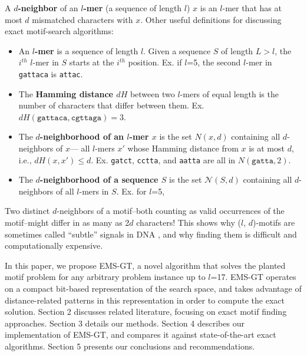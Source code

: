 \documentclass[conference]{IEEEtran}
\begin{document}
	\noindent A {\boldmath \textbf{$d$-neighbor} of an \textbf{$l$-mer}} (a sequence of length $l$) $x$ is an $l$-mer that has at most $d$ mismatched characters with $x$. Other useful definitions for discussing exact motif-search algorithms:
	\begin{itemize}
		\item An \textbf{\boldmath $l$-mer} is a sequence of length $l$.
		Given a sequence $S$ of length $L > l$, the $i^{th}$ $l$-mer in $S$ starts at the $i^{th}$ position.
		Ex. if $l$=5, the second $l$-mer in \texttt{gattaca} is \texttt{attac}.

		\item The \textbf{\boldmath Hamming distance $dH$} 
		between two $l$-mers of equal length is the number of characters that differ between them.
		Ex. $dH(\texttt{gattaca}, \texttt{cgttaga}) = 3$.

		\item The \textbf{\boldmath $d$-neighborhood of an $l$-mer $x$}
		is the set {\boldmath $N(x, d)$} containing all $d$-neighbors of $x$---
		all $l$-mers $x'$ whose Hamming distance from $x$ is at most $d$, i.e., {\boldmath $dH (x, x') \leq d$}.
		\newline Ex. \texttt{gatct}, \texttt{cctta}, and \texttt{aatta} are all in $N(\texttt{gatta}, 2)$.

		\item The \textbf{\boldmath $d$-neighborhood of a sequence $S$} %
		is the set {\boldmath $\mathcal{N}(S, d)$}
		\newline containing all $d$-neighbors of all $l$-mers in $S$. Ex. for $l$=5,
		
		\end{itemize}

	Two distinct $d$-neighbors of a motif--both counting as valid occurrences of the motif--might differ in as many as 2$d$ characters! This shows why ($l$, $d$)-motifs are sometimes called “subtle” signals in DNA  \cite{pevzner2000combinatorial}, and why finding them is difficult and computationally expensive.

	In this paper, we propose EMS-GT, a novel algorithm that solves the planted motif problem for any arbitrary problem instance up to $l$=17. EMS-GT operates on a compact bit-based representation of the search space, and takes advantage of distance-related patterns in this representation in order to compute the exact solution. Section 2 discusses related literature, focusing on exact motif finding approaches. Section 3 details our methods. Section 4 describes our implementation of EMS-GT, and compares it against state-of-the-art exact algorithms. Section 5 presents our conclusions and recommendations.
\end{document}
